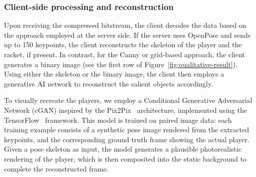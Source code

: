 \documentclass[manuscript, screen]{acmart}
\begin{document}

\subsubsection*{Client-side processing and reconstruction}
Upon receiving the compressed bitstream, the client decodes the data based on the approach employed at the server side. If the server uses OpenPose and sends up to 150 keypoints, the client reconstructs the skeleton of the player and the racket, if present. In contrast, for the Canny or grid-based approach, the client generates a binary image (see the first row of Figure~\ref{fig:qualitative-result}). Using either the skeleton or the binary image, the client then employs a generative AI network to reconstruct the salient objects accordingly.


To visually recreate the players, we employ a Conditional Generative Adversarial Network (cGAN) inspired by the Pix2Pix~\cite{isola2017pix2pix} architecture, implemented using the TensorFlow~\cite{tensorflow2015} framework.
This model is trained on paired image data: each training example consists of a synthetic pose image rendered from the extracted keypoints, and the corresponding ground truth frame showing the actual player. 
Given a pose skeleton as input, the model generates a plausible photorealistic rendering of the player, which is then composited into the static background to complete the reconstructed frame.

\end{document}
